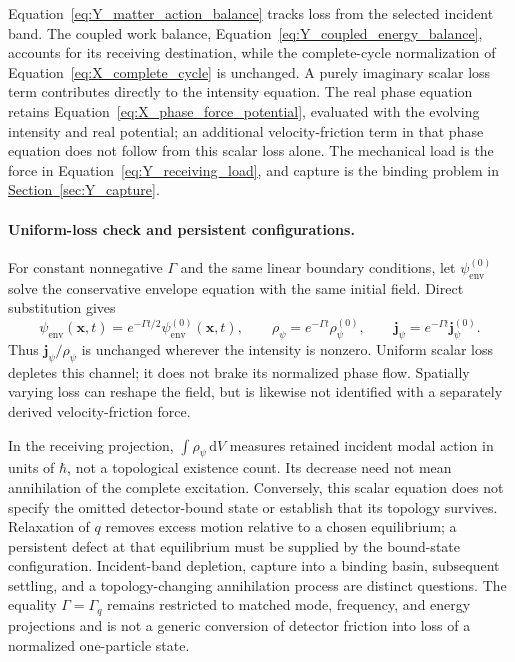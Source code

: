 Equation~\eqref{eq:Y_matter_action_balance} tracks loss from the selected incident band. The coupled work balance, Equation~\eqref{eq:Y_coupled_energy_balance}, accounts for its receiving destination, while the complete-cycle normalization of Equation~\eqref{eq:X_complete_cycle} is unchanged. A purely imaginary scalar loss term contributes directly to the intensity equation. The real phase equation retains Equation~\eqref{eq:X_phase_force_potential}, evaluated with the evolving intensity and real potential; an additional velocity-friction term in that phase equation does not follow from this scalar loss alone. The mechanical load is the force in Equation~\eqref{eq:Y_receiving_load}, and capture is the binding problem in \hyperref[sec:Y_capture]{Section~\ref*{sec:Y_capture}}.

\paragraph{Uniform-loss check and persistent configurations.}
For constant nonnegative $\Gamma$ and the same linear boundary conditions, let $\psi_{\mathrm{env}}^{(0)}$ solve the conservative envelope equation with the same initial field. Direct substitution gives
\[
 \psi_{\mathrm{env}}(\mathbf x,t)
 =e^{-\Gamma t/2}\psi_{\mathrm{env}}^{(0)}(\mathbf x,t),\qquad
 \rho_\psi=e^{-\Gamma t}\rho_\psi^{(0)},\qquad
 \mathbf j_\psi=e^{-\Gamma t}\mathbf j_\psi^{(0)}.
\]
Thus $\mathbf j_\psi/\rho_\psi$ is unchanged wherever the intensity is nonzero. Uniform scalar loss depletes this channel; it does not brake its normalized phase flow. Spatially varying loss can reshape the field, but is likewise not identified with a separately derived velocity-friction force.

In the receiving projection, $\int\rho_\psi\,\mathrm dV$ measures retained incident modal action in units of $\hbar$, not a topological existence count. Its decrease need not mean annihilation of the complete excitation. Conversely, this scalar equation does not specify the omitted detector-bound state or establish that its topology survives. Relaxation of $q$ removes excess motion relative to a chosen equilibrium; a persistent defect at that equilibrium must be supplied by the bound-state configuration. Incident-band depletion, capture into a binding basin, subsequent settling, and a topology-changing annihilation process are distinct questions. The equality $\Gamma=\Gamma_q$ remains restricted to matched mode, frequency, and energy projections and is not a generic conversion of detector friction into loss of a normalized one-particle state.

